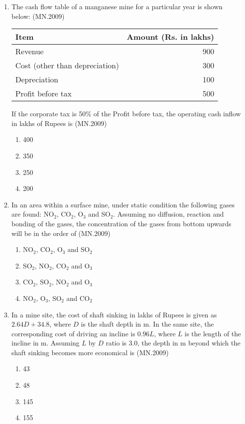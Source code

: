 \documentclass[journal]{IEEEtran}
\numberwithin{equation}{enumi}
\numberwithin{figure}{enumi}
\begin{document}
\begin{enumerate}
\item The cash flow table of a manganese mine for a particular year is shown below:
\hfill{(MN.2009)}
\begin{center}
\begin{tabular}{|l|r|}
\hline
\textbf{Item} & \textbf{Amount (Rs. in lakhs)} \\
\hline
Revenue & 900 \\
Cost (other than depreciation) & 300 \\
Depreciation & 100 \\
\hline
Profit before tax & 500 \\
\hline
\end{tabular}
\end{center}

If the corporate tax is 50\% of the Profit before tax, the operating cash inflow in lakhs of Rupees is
\hfill{(MN.2009)}
\begin{enumerate}[label=(\Alph*)]
\item 400
\item 350
\item 250
\item 200
\end{enumerate}

\item In an area within a surface mine, under static condition the following gases are found: NO$_2$, CO$_2$, O$_3$ and SO$_2$. Assuming no diffusion, reaction and bonding of the gases, the concentration of the gases from bottom upwards will be in the order of
\hfill{(MN.2009)}
\begin{enumerate}[label=(\Alph*)]
\item NO$_2$, CO$_2$, O$_3$ and SO$_2$
\item SO$_2$, NO$_2$, CO$_2$ and O$_3$
\item CO$_2$, SO$_2$, NO$_2$ and O$_3$
\item NO$_2$, O$_3$, SO$_2$ and CO$_2$
\end{enumerate}

\item In a mine site, the cost of shaft sinking in lakhs of Rupees is given as $2.64D + 34.8$, where $D$ is the shaft depth in m. In the same site, the corresponding cost of driving an incline is $0.96L$, where $L$ is the length of the incline in m. Assuming $L$ by $D$ ratio is 3.0, the depth in m beyond which the shaft sinking becomes more economical is
\hfill{(MN.2009)}
\begin{enumerate}[label=(\Alph*)]
\item 43
\item 48
\item 145
\item 155
\end{enumerate}


\end{enumerate}
\end{document}
